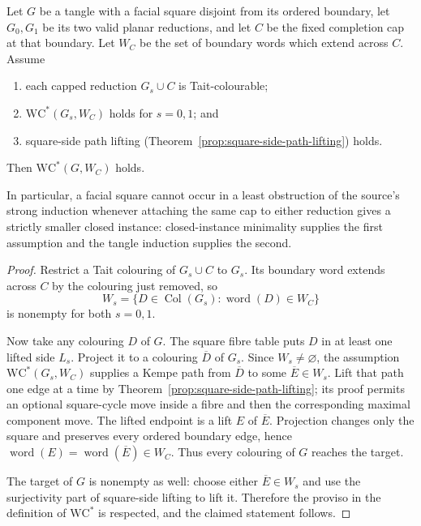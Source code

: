 \begin{theorem}
\label{prop:target-square-migration}
\Sprose
Let \(G\) be a tangle with a facial square disjoint from its ordered boundary,
let \(G_0,G_1\) be its two valid planar reductions, and let \(C\) be the
fixed completion cap at that boundary.  Let \(W_C\) be the set of boundary
words which extend across \(C\).  Assume
\begin{enumerate}
\item each capped reduction \(G_s\cup C\) is Tait-colourable;
\item \(\mathrm{WC}^{*}(G_s,W_C)\) holds for \(s=0,1\); and
\item square-side path lifting
  (Theorem~\ref{prop:square-side-path-lifting}) holds.
\end{enumerate}
Then \(\mathrm{WC}^{*}(G,W_C)\) holds.

In particular, a facial square cannot occur in a least obstruction of the
source's strong induction whenever attaching the same cap to either
reduction gives a strictly smaller closed instance: closed-instance
minimality supplies the first assumption and the tangle induction supplies
the second.
\end{theorem}

\begin{proof}
Restrict a Tait colouring of \(G_s\cup C\) to \(G_s\).  Its boundary word
extends across \(C\) by the colouring just removed, so
\[
 W_s=\{D\in\operatorname{Col}(G_s):
                  \operatorname{word}(D)\in W_C\}
\]
is nonempty for both \(s=0,1\).

Now take any colouring \(D\) of \(G\).  The square fibre table puts \(D\) in
at least one lifted side \(L_s\).  Project it to a colouring
\(\overline D\) of \(G_s\).  Since \(W_s\ne\varnothing\), the assumption
\(\mathrm{WC}^{*}(G_s,W_C)\) supplies a Kempe path from
\(\overline D\) to some \(\overline E\in W_s\).  Lift that path one edge at
a time by Theorem~\ref{prop:square-side-path-lifting}; its proof permits an
optional square-cycle move inside a fibre and then the corresponding maximal
component move.  The lifted endpoint is a lift \(E\) of \(\overline E\).
Projection changes only the square and preserves every ordered boundary
edge, hence
\(\operatorname{word}(E)=\operatorname{word}(\overline E)\in W_C\).
Thus every colouring of \(G\) reaches the target.

The target of \(G\) is nonempty as well: choose either
\(\overline E\in W_s\) and use the surjectivity part of square-side lifting
to lift it.  Therefore the proviso in the definition of
\(\mathrm{WC}^{*}\) is respected, and the claimed statement follows.
\end{proof}

